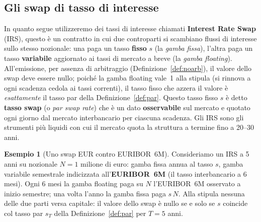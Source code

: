 \documentclass[11pt,a4paper]{article}
\theoremstyle{plain}
\theoremstyle{definition}
\newtheorem{esempio}[teorema]{Esempio}
\theoremstyle{remark}
\newtheorem*{osservazione}{Osservazione}
\begin{document}

\subsection{Gli swap di tasso di interesse}
\label{sec:swap}
In quanto segue utilizzeremo dei tassi di interesse chiamati \textbf{Interest Rate Swap} (IRS), questo \`e un contratto in cui due controparti si scambiano
flussi di interesse sullo stesso nozionale: una paga un tasso \textbf{fisso} $s$ (la
\emph{gamba fissa}), l'altra paga un tasso \textbf{variabile} aggiornato ai tassi di
mercato a breve (la \emph{gamba floating}). All'emissione, per assenza di arbitraggio
(Definizione~\ref{def:noarb}), il valore dello swap deve essere nullo; poich\'e la gamba
floating vale~1 alla stipula (si rinnova a ogni scadenza cedola ai tassi correnti), il
tasso fisso che azzera il valore \`e \emph{esattamente} il tasso par della
Definizione~\ref{def:par}. Questo tasso fisso $s$ \`e detto \textbf{tasso swap} (o
\emph{par swap rate}) che è un dato
\textbf{osservabile} sul mercato e quotato ogni giorno dal mercato interbancario per ciascuna scadenza. Gli IRS sono gli strumenti pi\`u liquidi con cui il mercato quota la struttura a
termine fino a 20--30 anni.

\begin{esempio}[Uno swap EUR contro EURIBOR~6M]
\label{ex:swap-euribor}
Consideriamo un IRS a 5 anni su nozionale $N=1$ milione di euro: gamba fissa annua al tasso
$s$, gamba variabile semestrale indicizzata all'\textbf{EURIBOR~6M} (il tasso interbancario a
6 mesi). Ogni 6 mesi la gamba floating paga su $N$ l'EURIBOR~6M osservato a inizio semestre;
una volta l'anno la gamba fissa paga $s\,N$. Alla stipula nessuna delle due parti versa
capitale: il valore dello swap \`e nullo se e solo se $s$ coincide col tasso par $s_T$ della
Definizione~\ref{def:par} per $T=5$ anni. %
\end{esempio}
\end{document}
